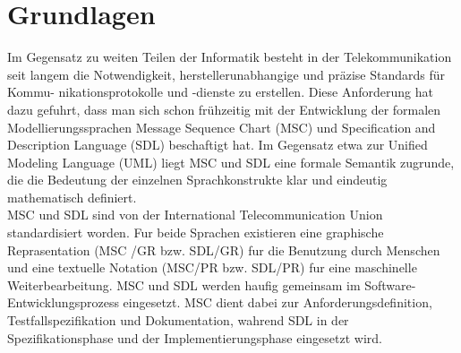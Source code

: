\chapter{Grundlagen}
\label{ch:Grundlagen}
Im Gegensatz zu weiten Teilen der Informatik besteht in der Telekommunikation seit langem die Notwendigkeit, herstellerunabhangige und präzise Standards für Kommu- nikationsprotokolle und -dienste zu erstellen. Diese Anforderung hat dazu gefuhrt, dass man sich schon frühzeitig mit der Entwicklung der formalen Modellierungssprachen Message Sequence Chart (MSC) und Specification and Description Language (SDL) beschaftigt hat. Im Gegensatz etwa zur Unified Modeling Language (UML) liegt MSC und SDL eine formale Semantik zugrunde, die die Bedeutung der einzelnen Sprachkonstrukte klar und eindeutig mathematisch definiert.\\
MSC und SDL sind von der International Telecommunication Union standardisiert worden. Fur beide Sprachen existieren eine graphische Reprasentation (MSC /GR bzw. SDL/GR) fur die Benutzung durch Menschen und eine textuelle Notation (MSC/PR bzw. SDL/PR) fur eine maschinelle Weiterbearbeitung. MSC und SDL werden haufig gemeinsam im Software-Entwicklungsprozess eingesetzt. MSC dient dabei zur Anforderungsdefinition, Testfallspezifikation und Dokumentation, wahrend SDL in der Spezifikationsphase und der Implementierungsphase eingesetzt wird.




